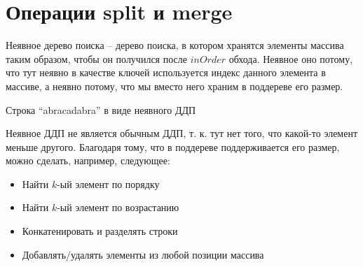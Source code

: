\section{Операции split и merge}




\begin{definition}
    Неявное дерево поиска -- дерево поиска, в котором хранятся элементы массива таким образом, чтобы он получился после $inOrder$ обхода. Неявное оно потому, что тут неявно в качестве ключей используется индекс данного элемента в массиве, а неявно потому, что мы вместо него храним в поддереве его размер. 
\end{definition}

\begin{example}
    Строка ``abracadabra'' в виде неявного ДДП
    \begin{center} 
    \end{center}
\end{example}

Неявное ДДП не является обычным ДДП, т. к. тут нет того, что какой-то элемент меньше другого. Благодаря тому, что в поддереве поддерживается его размер, можно сделать, например, следующее:

\begin{itemize}
    \item Найти $k$-ый элемент по порядку
    \item Найти $k$-ый элемент по возрастанию
    \item Конкатенировать и разделять строки
    \item Добавлять/удалять элементы из любой позиции массива
\end{itemize}

